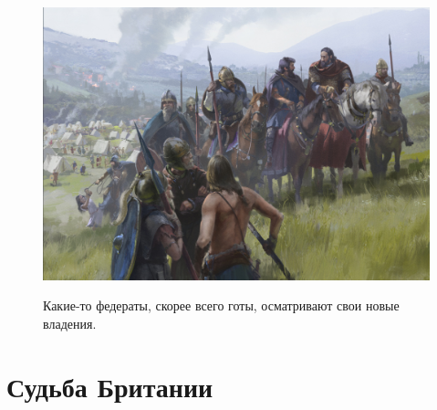 \begin{figure}[h!tb]
	\centering\includegraphics[scale=0.25]{Relig_gambit/157293236414589357.png}
	\label{fig:gambit7} %
	\caption{Какие-то федераты, скорее всего готы, осматривают свои новые владения. 	}
\end{figure}

\section{Судьба Британии}

